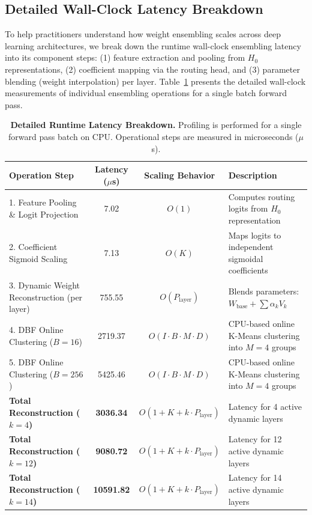 \subsection{Detailed Wall-Clock Latency Breakdown}
To help practitioners understand how weight ensembling scales across deep learning architectures, we break down the runtime wall-clock ensembling latency into its component steps: (1) feature extraction and pooling from $H_0$ representations, (2) coefficient mapping via the routing head, and (3) parameter blending (weight interpolation) per layer. Table~\ref{tab:latency_breakdown} presents the detailed wall-clock measurements of individual ensembling operations for a single batch forward pass.

\begin{table}[t]
\caption{\textbf{Detailed Runtime Latency Breakdown.} Profiling is performed for a single forward pass batch on CPU. Operational steps are measured in microseconds ($\mu$s).}
\label{tab:latency_breakdown}
\vskip 0.15in
\begin{center}
\begin{small}
\setlength{\tabcolsep}{3.0pt}
\begin{tabular}{lccp{4.7cm}}
\toprule
Operation Step & Latency ($\mu$s) & Scaling Behavior & Description \\
\midrule
1. Feature Pooling \& Logit Projection & 7.02 & $O(1)$ & Computes routing logits from $H_0$ representation \\
2. Coefficient Sigmoid Scaling & 7.13 & $O(K)$ & Maps logits to independent sigmoidal coefficients \\
3. Dynamic Weight Reconstruction (per layer) & 755.55 & $O(P_{\text{layer}})$ & Blends parameters: $W_{\text{base}} + \sum \alpha_k V_k$ \\
4. DBF Online Clustering ($B = 16$) & 2719.37 & $O(I \cdot B \cdot M \cdot D)$ & CPU-based online K-Means clustering into $M=4$ groups \\
5. DBF Online Clustering ($B = 256$) & 5425.46 & $O(I \cdot B \cdot M \cdot D)$ & CPU-based online K-Means clustering into $M=4$ groups \\
\midrule
\textbf{Total Reconstruction ($k = 4$)} & \textbf{3036.34} & $O(1 + K + k \cdot P_{\text{layer}})$ & Latency for 4 active dynamic layers \\
\textbf{Total Reconstruction ($k = 12$)} & \textbf{9080.72} & $O(1 + K + k \cdot P_{\text{layer}})$ & Latency for 12 active dynamic layers \\
\textbf{Total Reconstruction ($k = 14$)} & \textbf{10591.82} & $O(1 + K + k \cdot P_{\text{layer}})$ & Latency for 14 active dynamic layers \\
\bottomrule
\end{tabular}
\end{small}
\end{center}
\vskip -0.1in
\end{table}

